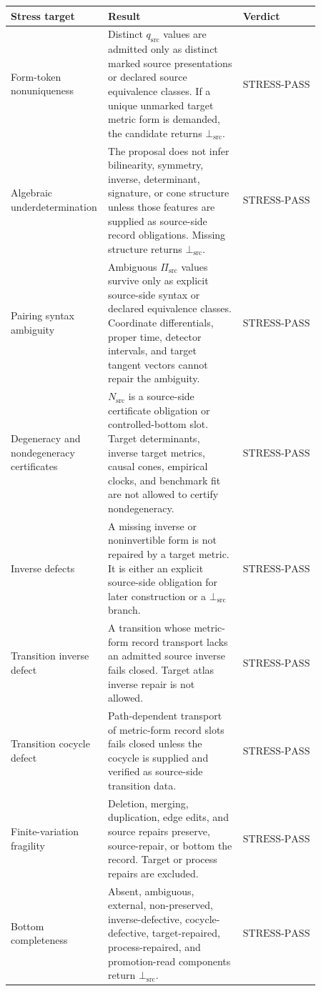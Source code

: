\documentclass[11pt]{article}
\newcommand{\FormTok}{q_{\mathrm{src}}}
\newcommand{\PairTok}{\Pi_{\mathrm{src}}}
\newcommand{\NondegTok}{N_{\mathrm{src}}}
\newcommand{\BottomSrc}{\bot_{\mathrm{src}}}
\newcommand{\StressPass}{\mathrm{STRESS\mbox{-}PASS}}
\begin{document}
\begin{longtable}{p{0.25\linewidth}p{0.43\linewidth}p{0.18\linewidth}}
\toprule
Stress target & Result & Verdict \\
\midrule
Form-token nonuniqueness & Distinct \(\FormTok\) values are admitted only as
distinct marked source presentations or declared source equivalence classes.
If a unique unmarked target metric form is demanded, the candidate returns
\(\BottomSrc\). & \(\StressPass\) \\
Algebraic underdetermination & The proposal does not infer bilinearity,
symmetry, inverse, determinant, signature, or cone structure unless those
features are supplied as source-side record obligations. Missing structure
returns \(\BottomSrc\). & \(\StressPass\) \\
Pairing syntax ambiguity & Ambiguous \(\PairTok\) values survive only as
explicit source-side syntax or declared equivalence classes. Coordinate
differentials, proper time, detector intervals, and target tangent vectors
cannot repair the ambiguity. & \(\StressPass\) \\
Degeneracy and nondegeneracy certificates & \(\NondegTok\) is a source-side
certificate obligation or controlled-bottom slot. Target determinants,
inverse target metrics, causal cones, empirical clocks, and benchmark fit are
not allowed to certify nondegeneracy. & \(\StressPass\) \\
Inverse defects & A missing inverse or noninvertible form is not repaired by a
target metric. It is either an explicit source-side obligation for later
construction or a \(\BottomSrc\) branch. & \(\StressPass\) \\
Transition inverse defect & A transition whose metric-form record transport
lacks an admitted source inverse fails closed. Target atlas inverse repair is
not allowed. & \(\StressPass\) \\
Transition cocycle defect & Path-dependent transport of metric-form record
slots fails closed unless the cocycle is supplied and verified as source-side
transition data. & \(\StressPass\) \\
Finite-variation fragility & Deletion, merging, duplication, edge edits, and
source repairs preserve, source-repair, or bottom the record. Target or
process repairs are excluded. & \(\StressPass\) \\
Bottom completeness & Absent, ambiguous, external, non-preserved,
inverse-defective, cocycle-defective, target-repaired, process-repaired, and
promotion-read components return \(\BottomSrc\). & \(\StressPass\) \\

\end{longtable}
\end{document}
